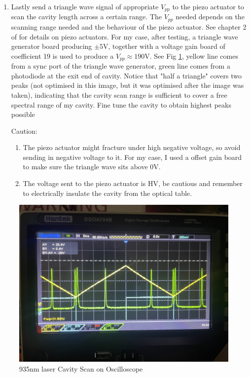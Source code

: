 \documentclass[12pt]{report}
\begin{document}
\begin{enumerate}
    \item Lastly send a triangle wave signal of appropriate $V_{pp}$ to the piezo actuator to scan the cavity length across a certain range. The $V_{pp}$ needed depends on the scanning range needed and the behaviour of the piezo actuator. See chapter 2 of \cite{FundamentalPrinciplesofEngineeringNanometrology} for details on piezo actuators. For my case, after testing, a triangle wave generator board producing $\pm 5$V, together with a voltage gain board of coefficient 19 is used to produce a $V_{pp} \approx 190$V. See Fig \ref{fig:935cavityScan}, yellow line comes from a sync port of the triangle wave generator, green line comes from a photodiode at the exit end of cavity. Notice that "half a triangle" covers two peaks (not optimised in this image, but it was optimised after the image was taken), indicating that the cavity scan range is sufficient to cover a free spectral range of my cavity. Fine tune the cavity to obtain highest peaks possible 
    \par
    Caution: 
    \begin{enumerate}
        \item The piezo actuator might fracture under high negative voltage, so avoid sending in negative voltage to it. For my case, I used a offset gain board to make sure the triangle wave sits above 0V.
        \item The voltage sent to the piezo actuator is HV, be cautious and remember to electrically insulate the cavity from the optical table.
    \end{enumerate}
\end{enumerate}

\begin{figure}[H]
    \centering
    \includegraphics[width=.8\textwidth]{935cavityScan.jpeg}
    \caption{935nm laser Cavity Scan on Oscilloscope}
    \label{fig:935cavityScan}
\end{figure}
\end{document}
